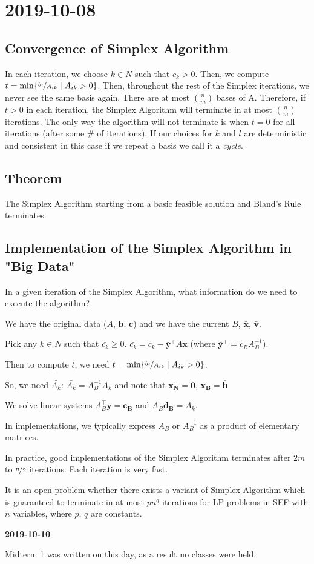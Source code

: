 \section{2019-10-08}
\subsection{Convergence of Simplex Algorithm}
In each iteration, we choose $k\in N$ such that $c_k>0$. Then, we compute 
$t=\min\{\nicefrac{b_i}{A_{ik}}\mid A_{ik}>0\}$. Then, throughout the
rest of the Simplex iterations, we never see the same basis again. 
There are at most $\binom{n}{m}$ bases of A. Therefore, if $t>0$ in each iteration,
the Simplex Algorithm will terminate in at most $\binom{n}{m}$ iterations. The only
way the algorithm will not terminate is when $t=0$ for all iterations
(after some \# of iterations). If our choices for $k$ and $l$ are deterministic and
consistent in this case if we repeat a basis we call it a \emph{cycle}.

\begin{thmbox}
    \subsection{Theorem}
    The Simplex Algorithm starting from a basic feasible solution and
    Bland's Rule terminates.
\end{thmbox}

\subsection{Implementation of the Simplex Algorithm in "Big Data"}
In a given iteration of the Simplex Algorithm, what information do we need to
execute the algorithm?


We have the original data ($A$, $\bm{b}$, $\bm{c}$) and we have the
current $B$, $\bm{\bar{x}}$, $\bm{\bar{v}}$.

Pick any $k\in N$ such that $\bar{c_k}\ge 0$. $\bar{c_k}=c_k-\bm{\bar{y}}^\top  A\bm{x}$ 
(where $\bm{\bar{y}}^\top =c_B A_B^{-1}$).

Then to compute $t$, we need
$t=\min\{\nicefrac{b_i}{A_{ik}}\mid A_{ik}>0\}$.

So, we need
$\bar{A_k}$: $\bar{A_k}=A_B^{-1}A_k$ and note that $\bm{\bar{x_N}}=\bm{0}$,
$\bm{\bar{x_B}}=\bm{\bar{b}}$


We solve linear systems $A_B^\top \bm{y}=\bm{c_B}$ and $A_B\bm{d_B}=A_k$.

In implementations, we typically express $A_B$ or $A_B^{-1}$ as a product of elementary
matrices.

In practice, good implementations of the Simplex Algorithm terminates after $2m$ to
$\nicefrac{n}{2}$ iterations. Each iteration is very fast.

It is an open problem whether there exists a variant of Simplex Algorithm which is
guaranteed to terminate in at most $pn^q$ iterations for LP problems in SEF with $n$
variables, where $p$, $q$ are constants.

\textbf{2019-10-10}

Midterm 1 was written on this day, as a result no classes were
held.